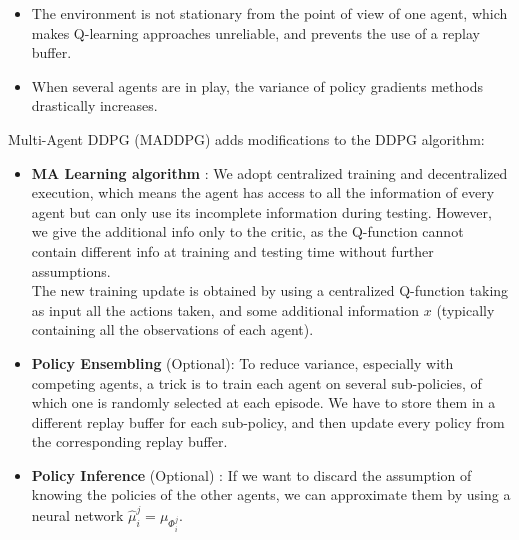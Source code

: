 \documentclass[10pt,landscape]{article}
\begin{document}
\begin{multicols}{3}
\begin{itemize}[leftmargin=*]
    \item The environment is not stationary from the point of view of one agent, which makes Q-learning approaches unreliable, and prevents the use of a replay buffer.
    \item When several agents are in play, the variance of policy gradients methods drastically increases.
\end{itemize}
\medskip
Multi-Agent DDPG (MADDPG) adds modifications to the DDPG algorithm:\\
\begin{itemize}[leftmargin=*]
   \item \textbf{MA Learning algorithm} : We adopt centralized training and decentralized execution, which means the agent has access to all the information of every agent but can only use its incomplete information during testing. However, we give the additional info only to the critic, as the Q-function cannot contain different info at training and testing time without further assumptions.\\
    The new training update is obtained by using a centralized Q-function taking as input all the actions taken, and some additional information $x$ (typically containing all the observations of each agent).
    \item \textbf{Policy Ensembling} (Optional): To reduce variance, especially with competing agents, a trick is to train each agent on several sub-policies, of which one is randomly selected at each episode. We have to store them in a different replay buffer for each sub-policy, and then update every policy from the corresponding replay buffer.
    \item \textbf{Policy Inference} (Optional) : If we want to discard the assumption of knowing the policies of the other agents, we can approximate them by using a neural network $\hat{\mu}_i^j = \mu_{\Phi_i^j}$.
\end{itemize}


\end{multicols}
\newpage
\end{document}
